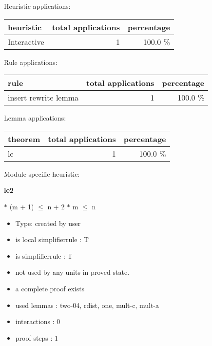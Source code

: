 \documentclass[a4paper]{article}
\begin{document}
\medskip


Heuristic applications:

\begin{supertabular}{l|r|r}
heuristic	& total applications & percentage \\ \hline
Interactive & 1 & 100.0 \% \\

\end{supertabular}

Rule applications:

\begin{supertabular}{l|r|r}
rule	        & total applications & percentage \\ \hline
insert rewrite lemma & 1 & 100.0 \% \\

\end{supertabular}

Lemma applications:

\begin{supertabular}{l|r|r}
theorem	        & total applications & percentage \\ \hline
le & 1 & 100.0 \% \\

\end{supertabular}

Module specific heuristic:

\pagebreak

{\LARGE\bf le2}\label{lemma-le2}

\medskip

  $*$ (m + 1) $\le$ n + 2  $*$ m $\le$ n

\begin{itemize}

\item Type: created by user

\item is local simplifierrule : T
\item is simplifierrule : T
\item not used by any units in proved state.
\item       a complete proof exists
\item       used lemmas  : two-04, rdist, one, mult-c, mult-a
\item       interactions : 0
\item       proof steps  : 1
\end{itemize}

\medskip
\end{document}
